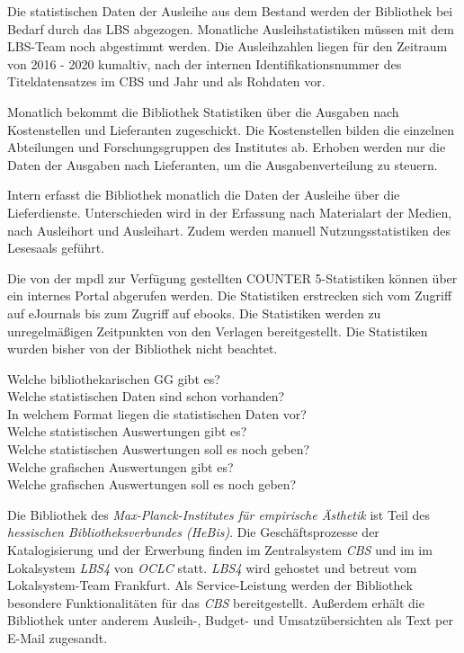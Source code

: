 Die statistischen Daten der Ausleihe aus dem Bestand werden der Bibliothek bei Bedarf durch das LBS abgezogen. 
Monatliche Ausleihstatistiken müssen mit dem LBS-Team noch abgestimmt werden. Die Ausleihzahlen liegen für 
den Zeitraum von 2016 - 2020 kumaltiv, nach der internen  Identifikationsnummer des Titeldatensatzes im 
\acrshort{CBS} und Jahr und als Rohdaten vor.

Monatlich bekommt die Bibliothek Statistiken über die Ausgaben nach Kostenstellen und Lieferanten zugeschickt. 
Die Kostenstellen bilden die einzelnen Abteilungen und Forschungsgruppen des Institutes ab. 
Erhoben werden nur die Daten der Ausgaben nach Lieferanten, um die Ausgabenverteilung zu steuern. 

Intern erfasst die Bibliothek monatlich die Daten der Ausleihe über die Lieferdienste. Unterschieden 
wird in der Erfassung nach Materialart der Medien, nach Ausleihort und Ausleihart. Zudem werden manuell Nutzungsstatistiken
des Lesesaals geführt.

Die von der \acrshort{mpdl} zur Verfügung gestellten COUNTER 5-Statistiken können über ein internes 
Portal abgerufen werden. Die Statistiken erstrecken sich vom Zugriff auf eJournals bis zum Zugriff auf ebooks.
Die Statistiken werden zu unregelmäßigen Zeitpunkten von den Verlagen bereitgestellt. 
Die Statistiken wurden bisher von der Bibliothek nicht beachtet.





\clearpage
Welche bibliothekarischen GG gibt es?\\
Welche statistischen Daten sind schon vorhanden?\\
In welchem Format liegen die statistischen Daten vor?\\
Welche statistischen Auswertungen gibt es?\\
Welche statistischen Auswertungen soll es noch geben?\\
Welche grafischen Auswertungen gibt es?\\
Welche grafischen Auswertungen soll es noch geben?



Die Bibliothek des \textit{Max-Planck-Institutes für empirische Ästhetik}
ist Teil des \textit{hessischen Bibliotheksverbundes (HeBis)}. Die Geschäftsprozesse
der Katalogisierung und der Erwerbung finden im Zentralsystem \textit{CBS} und im im Lokalsystem \textit{LBS4} von
\textit{OCLC} statt. \textit{LBS4} wird gehostet und betreut vom Lokalsystem-Team Frankfurt. Als Service-Leistung werden der Bibliothek besondere Funktionalitäten
für das \textit{CBS} bereitgestellt. Außerdem erhält die Bibliothek unter anderem Ausleih-, Budget- und
Umsatzübersichten als Text per E-Mail zugesandt.


